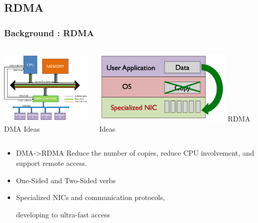 \documentclass[11pt]{beamer}                                                                                                   %
\begin{document}
\subsection{RDMA}
\begin{frame}
	\frametitle{Background : RDMA}
	\begin{columns}
		\begin{column}{0.5\textwidth}
			\centering
			\includegraphics[height=3.5cm]{00.png}
			\\
			{DMA Ideas}
		\end{column}
		\begin{column}{0.5\textwidth}
			\centering
			\includegraphics[height=3.5cm]{01.png}
			{RDMA Ideas}
		\end{column}
	\end{columns}
%			
			

\begin{itemize}
	\item DMA->RDMA Reduce the number of copies, reduce CPU involvement, and support remote access.
	\item One-Sided and Two-Sided verbs
	\item {Specialized NICs and communication protocols, 
	
	
	developing to ultra-fast access}
\end{itemize}

\end{frame}
\end{document}
